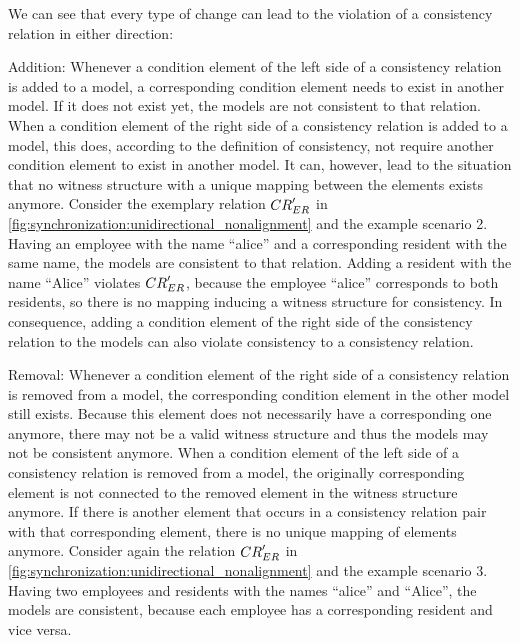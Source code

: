 We can see that every type of change can lead to the violation of a consistency relation in either direction:
\begin{properdescription}
    \item[Addition:] Whenever a condition element of the left side of a consistency relation is added to a model, a corresponding condition element needs to exist in another model. If it does not exist yet, the models are not consistent to that relation.
    When a condition element of the right side of a consistency relation is added to a model, this does, according to the definition of consistency, not require another condition element to exist in another model. It can, however, lead to the situation that no witness structure with a unique mapping between the elements exists anymore.
    Consider the exemplary relation $\consistencyrelation{CR}{ER}'$ in \autoref{fig:synchronization:unidirectional_nonalignment} and the example scenario 2.
    Having an employee with the name \enquote{alice} and a corresponding resident with the same name, the models are consistent to that relation.
    Adding a resident with the name \enquote{Alice} violates $\consistencyrelation{CR}{ER}'$, because the employee \enquote{alice} corresponds to both residents, so there is no mapping inducing a witness structure for consistency.
    In consequence, adding a condition element of the right side of the consistency relation to the models can also violate consistency to a consistency relation.
    \item[Removal:] Whenever a condition element of the right side of a consistency relation is removed from a model, the corresponding condition element in the other model still exists. Because this element does not necessarily have a corresponding one anymore, there may not be a valid witness structure and thus the models may not be consistent anymore.
    When a condition element of the left side of a consistency relation is removed from a model, the originally corresponding element is not connected to the removed element in the witness structure anymore. If there is another element that occurs in a consistency relation pair with that corresponding element, there is no unique mapping of elements anymore.
    Consider again the relation $\consistencyrelation{CR}{ER}'$ in \autoref{fig:synchronization:unidirectional_nonalignment} and the example scenario 3.
    Having two employees and residents with the names \enquote{alice} and \enquote{Alice}, the models are consistent, because each employee has a corresponding resident and vice versa.

\end{properdescription}
